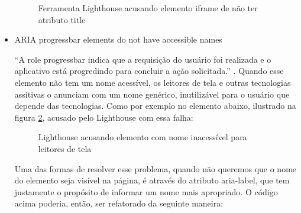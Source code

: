 \documentclass[
	12pt,				%
	openright,			%
	oneside,			%
	a4paper,			%
	chapter=TITLE,		%
	section=TITLE,		%
	subsection=TITLE,	%
	subsubsection=TITLE,%
	english,			%
	brazil				%
	]{abntex2}
\theoremstyle{definition}
\begin{document}
\begin{itemize}
\begin{figure}[!h]
\centering
\caption{Ferramenta Lighthouse acusando elemento iframe de não ter atributo title}
\label{Ferramenta Lighthouse acusando elemento iframe de não ter atributo title}
\end{figure}

\pagebreak

 \item ARIA progressbar elements do not have accessible names
   
“A role progressbar indica que a requisição do usuário foi realizada e o aplicativo está progredindo para concluir a ação solicitada.” \cite{world2014accessible}. Quando esse elemento não tem um nome acessível, os leitores de tela e outras tecnologias assitivas o anunciam com um nome genérico, inutilizável para o usuário que depende das tecnologias. Como por exemplo no elemento abaixo, ilustrado na figura \ref{Lighthouse acusando elemento com nome inacessível para leitores de tela}, acusado pelo Lighthouse com essa falha:

\begin{figure}[!h]
\centering
\caption{Lighthouse acusando elemento com nome inacessível para leitores de tela}
\label{Lighthouse acusando elemento com nome inacessível para leitores de tela}
\end{figure}

Uma das formas de resolver esse problema, quando não queremos que o nome do elemento seja visível na página, é através do atributo aria-label, que tem justamente o propósito de informar um nome mais apropriado. O código acima poderia, então, ser refatorado da seguinte maneira:


\end{itemize}
\end{document}
